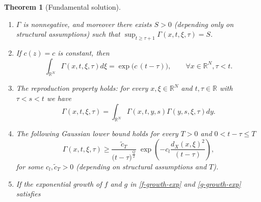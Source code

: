 \documentclass[11pt,a4paper]{article}
\newtheorem{theorem}{\bf Theorem}[section]
\numberwithin{equation}{section}
\newcommand{\R}{\mathbb{R}}
\def \rn {{\mathbb {R}}^{N}}
\def \GG {{\mathbb{G}}}
\def \H {\mathscr{H}_\GG}
\def \G {{\Gamma}}
\def \t {{\tau}}
\def \x {{\xi}}
\begin{document}
\begin{theorem}[Fundamental solution]
\begin{enumerate}
		\begin{equation}\label{u-conv}
			u(x,t):=\int_{\rn}\G(x,t,\xi,T_1)g(\xi)d\xi - \int_{T_1}^t\int_{\rn}\G(x,t,\xi,\t)f(\xi,\t)d\xi d\t,
		\end{equation}
		is a classical solution to
		\begin{equation}\label{cauchy}
			\begin{cases}
				\H u = f,\qquad &\mathrm{in}\;\rn\times(T_1,T),\\      
				u(x,T_1)=g(x),\qquad &\mathrm{in}\;\rn,
			\end{cases}
		\end{equation}
		as it solves $\H u = f$ according to Definition \ref{Def-classical}, and it takes the initial condition in the following sense
		\begin{equation}\label{datoiniziale}
			\lim\limits_{t\rightarrow T_1}\left( \int_{\rn}\G(x,t,\xi,T_1)g(\xi)d\xi - \int_{T_1}^t\int_{\rn}\G(x,t,\xi,\tau)f(\xi,\tau)d\xi d\tau\right)=g(x).
		\end{equation} 
		\label{item4}
		\item $\G$ is nonnegative, and moreover there exists $S>0$ (depending only on structural assumptions) such that $\sup_{t\geq \t+1} \G(x,t,\x,\t)=S$.\label{item5}
		\item If $c(z)=c$ is constant, then 
		\begin{equation}\label{normalization}
			\int_{\rn}\G(x,t,\x,\t)d\x = \exp\big(c\,(t-\t)\big),\qquad \forall x \in\rn, \t <t.
		\end{equation}
		\label{item6}
		\item The reproduction property holds: for every $x,\x\in\rn$ and $t,\t\in\R$ with $\t<s<t$ we have
		\begin{equation}\label{reproduction}
			\G(x,t,\x,\t) = \int_{\rn} \G(x,t,y,s)\G(y,s,\x,\t)dy.
		\end{equation}
		\label{item7}
		\item The following Gaussian lower bound holds for every $T>0$ and $0<t-\tau\leq T$ 
		\begin{equation}\label{Gaussian-estimates-lower}
			\G(x,t,\x,\t)\geq  \frac{\tilde c_T}{\big (t-\t\big)^{\frac{Q}{2}}} \;\exp{\left(-c_l\frac{d_X(x,\x)^2}{(t-\t)}\right)},
		\end{equation}
		for some $c_l,\tilde c_T>0$ (depending on structural assumptions and $T$).\label{item8}
		\item If the exponential growth of $f$ and $g$ in \eqref{f-growth-exp} and \eqref{g-growth-exp} satisfies
		\begin{equation}\label{h1}

\end{equation}
\end{enumerate}
\end{theorem}
\end{document}
